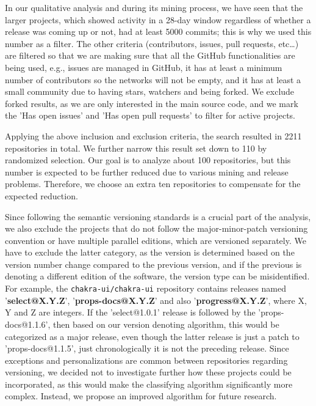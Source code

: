 In our qualitative analysis and during its mining process, we have seen that the larger projects, which showed activity in a 28-day window regardless of whether a release was coming up or not, had at least 5000 commits; this is why we used this number as a filter. The other criteria (contributors, issues, pull requests, etc\dots) are filtered so that we are making sure that all the GitHub functionalities are being used, e.g., issues are managed in GitHub, it has at least a minimum number of contributors so the networks will not be empty, and it has at least a small community due to having stars, watchers and being forked. We exclude forked results, as we are only interested in the main source code, and we mark the 'Has open issues' and 'Has open pull requests' to filter for active projects.

Applying the above inclusion and exclusion criteria, the search resulted in 2211 repositories in total. We further narrow this result set down to 110 by randomized selection. Our goal is to analyze about 100 repositories, but this number is expected to be further reduced due to various mining and release problems. Therefore, we choose an extra ten repositories to compensate for the expected reduction.

Since following the semantic versioning standards is a crucial part of the analysis, we also exclude the projects that do not follow the major-minor-patch versioning convention or have multiple parallel editions, which are versioned separately. We have to exclude the latter category, as the version is determined based on the version number change compared to the previous version, and if the previous is denoting a different edition of the software, the version type can be misidentified. For example, the \texttt{chakra-ui/chakra-ui} repository contains releases named '\textbf{select@X.Y.Z}', '\textbf{props-docs@X.Y.Z}' and also '\textbf{progress@X.Y.Z}', where X, Y and Z are integers. If the 'select@1.0.1' release is followed by the 'props-docs@1.1.6', then based on our version denoting algorithm, this would be categorized as a major release, even though the latter release is just a patch to 'props-docs@1.1.5', just chronologically it is not the preceding release. Since exceptions and personalizations are common between repositories regarding versioning, we decided not to investigate further how these projects could be incorporated, as this would make the classifying algorithm significantly more complex. Instead, we propose an improved algorithm for future research.

